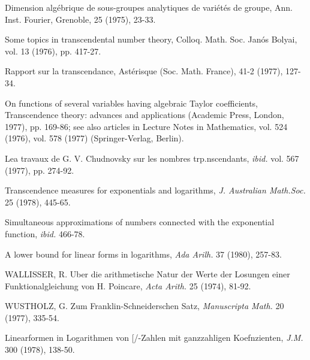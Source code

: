 \begin{hanglist}
    \item \hspace{1.5em} Dimension algébrique de sous-groupes analytiques de variétés de groupe, Ann. Inst. Fourier, Grenoble, 25 (1975), 23-33.
    \item \hspace{1.5em} Some topics in transcendental number theory, Colloq. Math. Soc. Janós Bolyai, vol. 13 (1976), pp. 417-27.
    \item \hspace{1.5em} Rapport sur la transcendance, Astérisque (Soc. Math. France), 41-2 (1977), 127-34.
    \item \hspace{1.5em} On functions of several variables having algebraic Taylor coefficients, Transcendence theory: advances and applications (Academic Press, London, 1977), pp. 169-86; see also articles in Lecture Notes in Mathematics, vol. 524 (1976), vol. 578 (1977) (Springer-Verlag, Berlin).
    \item Lea travaux de G. V. Chudnovsky sur les nombres trp.nscendants, \textit{ibid.} vol. 567 (1977), pp. 274-92.
    \item Transcendence measures for exponentials and logarithms, \textit{J. Australian Math.Soc.} 25 (1978), 445-65.
    \item Simultaneous approximations of numbers connected with the exponential function, \textit{ibid.} 466-78.
    \item A lower bound for linear forms in logarithms, \textit{Ada Arilh.} 37 (1980), 257-83.
    \item WALLISSER, R. Uber die arithmetische Natur der Werte der Losungen einer Funktionalgleichung von H. Poincare, \textit{Acta Arith.} 25 (1974), 81-92.
    \item WUSTHOLZ, G. Zum Franklin-Schneiderschen Satz, \textit{Manuscripta Math.} 20 (1977), 335-54.
    \item \hspace{1.5em} Linearformen in Logarithmen von [/-Zahlen mit ganzzahligen Koefnzienten, \textit{J.M.} 300 (1978), 138-50.
\end{hanglist}
